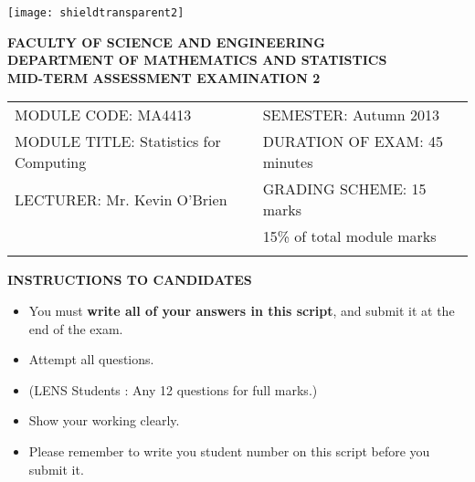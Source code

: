 \documentclass{article}
\begin{document}
\begin{center}
       \texttt{[image: shieldtransparent2]}
\end{center}

\begin{center}
\vspace{1cm}
\large \bf {FACULTY OF SCIENCE AND ENGINEERING} \\[0.5cm]
\normalsize DEPARTMENT OF MATHEMATICS AND STATISTICS \\[1.25cm]
\large \bf {MID-TERM ASSESSMENT EXAMINATION 2} \\[1.5cm]
\end{center}

\begin{tabular}{ll}
MODULE CODE: MA4413 & SEMESTER: Autumn 2013\\[1cm]
MODULE TITLE: Statistics for Computing & DURATION OF EXAM: 45 minutes \\[1cm]
LECTURER: Mr. Kevin O'Brien & GRADING SCHEME: 15 marks \\
& \phantom{GRADING SCHEME:} \footnotesize {15\% of total module marks} \\[0.2cm]
\\[1cm]
\end{tabular}
\begin{center}
{\bf INSTRUCTIONS TO CANDIDATES}
\end{center}
\begin{itemize}
\item You must \textbf{write all of your answers in this script}, and submit it at the end of the exam.
\item Attempt all questions.
\item (LENS Students : Any 12 questions for full marks.)
\item Show your working clearly.
\item Please remember to write you student number on this script before you submit it.

\end{itemize}
\end{document}
